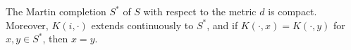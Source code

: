 The Martin completion $S^*$ of $S$ with respect to the metric $d$ is compact. Moreover, $K(i, \cdot)$ extends continuously to $S^*$, and if $K(\cdot, x) = K(\cdot, y)$ for $x, y \in S^*$, then $x = y$.
